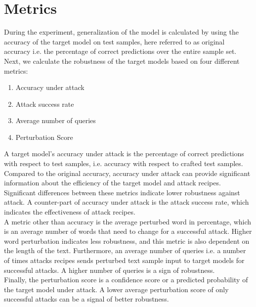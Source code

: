 \documentclass[%
	BCOR=8mm, %
	DIV=12,
	toc=bibliography, %
	toc=listof, %
	oneside, %
	egregdoesnotlikesansseriftitles, %
	]{scrbook}
\begin{document}
\section{Metrics}
\label{section:metrics}
During the experiment, generalization of the model is calculated by using the accuracy of the target model on test samples, here referred to as original accuracy i.e. the percentage of correct predictions over the entire sample set.
Next, we calculate the robustness of the target models based on four different metrics: 
\begin{enumerate}
    \item Accuracy under attack 
    \item Attack success rate
    \item  Average number of queries
    \item Perturbation Score
\end{enumerate}
A target model's accuracy under attack is the percentage of correct predictions with respect to test samples, i.e. accuracy with respect to crafted test samples. Compared to the original accuracy, accuracy under attack can provide significant information about the efficiency of the target model and attack recipes. Significant differences between these metrics indicate lower robustness against attack. A counter-part of accuracy under attack is the attack success rate, which indicates the effectiveness of attack recipes.\\
A metric other than accuracy is the average perturbed word in percentage, which is an average number of words that need to change for a successful attack. Higher word perturbation indicates less robustness, and this metric is also dependent on the length of the text. Furthermore, an average number of queries i.e. a number of times attacks recipes sends perturbed text sample input to target models for successful attacks. A higher number of queries is a sign of robustness.\\
Finally, the perturbation score is a confidence score or a predicted probability of the target model under attack. A lower average perturbation score of only successful attacks can be a signal of better robustness. 
\end{document}
